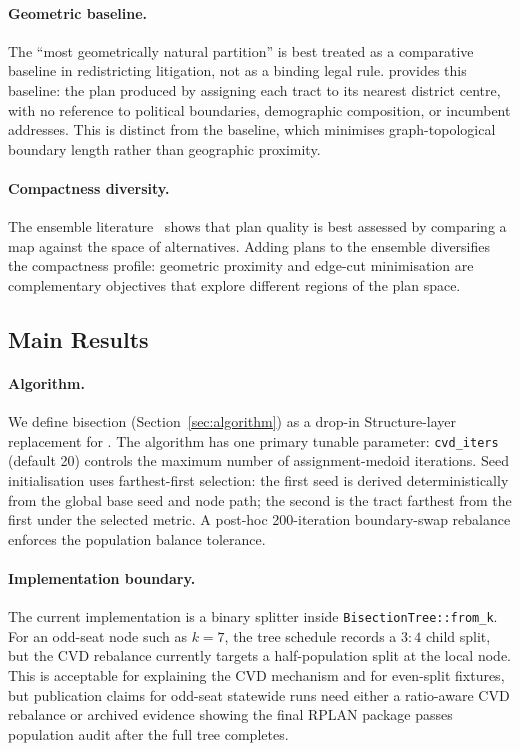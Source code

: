 \paragraph{Geometric baseline.}
The ``most geometrically natural partition'' is best treated as a comparative
baseline in redistricting litigation, not as a binding legal rule.
\cvd{} provides this baseline: the plan produced by assigning each tract to
its nearest district centre, with no reference to political boundaries,
demographic composition, or incumbent addresses.
This is distinct from the \metis{} baseline, which minimises graph-topological
boundary length rather than geographic proximity.

\paragraph{Compactness diversity.}
The ensemble literature~\citep{deford2021} shows that plan quality is best
assessed by comparing a map against the space of alternatives.
Adding \cvd{} plans to the ensemble diversifies the compactness profile:
geometric proximity and edge-cut minimisation are complementary objectives
that explore different regions of the plan space.

\subsection{Main Results}

\paragraph{Algorithm.}
We define \cvd{} bisection (Section~\ref{sec:algorithm}) as a drop-in
Structure-layer replacement for \metis{}.
The algorithm has one primary tunable parameter:
\texttt{cvd\_iters} (default 20) controls the maximum number of
assignment-medoid iterations.
Seed initialisation uses farthest-first selection: the first seed is derived
deterministically from the global base seed and node path; the second is the
tract farthest from the first under the selected metric.
A post-hoc 200-iteration boundary-swap rebalance enforces the population
balance tolerance.

\paragraph{Implementation boundary.}
The current implementation is a binary splitter inside
\texttt{BisectionTree::from\_k}.  For an odd-seat node such as $k=7$, the
tree schedule records a $3:4$ child split, but the CVD rebalance currently
targets a half-population split at the local node.
This is acceptable for explaining the CVD mechanism and for even-split
fixtures, but publication claims for odd-seat statewide runs need either a
ratio-aware CVD rebalance or archived evidence showing the final RPLAN package
passes population audit after the full tree completes.

